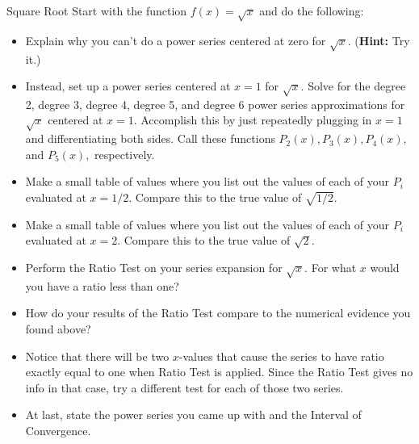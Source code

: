 \begin{exercise}{Square Root \Coffeecup \Coffeecup \Coffeecup}
Start with the function $f(x)=\sqrt{x}$ and do the following:

\begin{itemize}

\item Explain why you can't do a power series centered at zero for $\sqrt{x}$.  ({\bf Hint:} Try it.)
\item Instead, set up a power series centered at $x=1$ for $\sqrt{x}$.  Solve for the degree 2, degree 3, degree 4, degree 5, and degree 6 power series approximations for $\sqrt{x}$ centered at $x=1$.  Accomplish this by just repeatedly plugging in $x=1$ and differentiating both sides.  Call these functions $P_2(x), P_3(x), P_4(x),$ and $P_5(x),$ respectively.
\item Make a small table of values where you list out the values of each of your $P_i$ evaluated at $x=1/2$.  Compare this to the true value of $\sqrt{1/2}$.  
\item Make a small table of values where you list out the values of each of your $P_i$ evaluated at $x=2$.  Compare this to the true value of $\sqrt{2}$.
\item Perform the Ratio Test on your series expansion for $\sqrt{x}$.  For what $x$ would you have a ratio less than one?
\item How do your results of the Ratio Test compare to the numerical evidence you found above?
\item Notice that there will be two $x$-values that cause the series to have ratio exactly equal to one when Ratio Test is applied.  Since the Ratio Test gives no info in that case, try a different test for each of those two series.
\item At last, state the power series you came up with and the Interval of Convergence.
\end{itemize}
\end{exercise}

